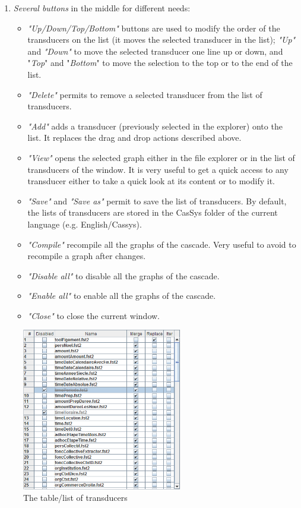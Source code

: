 \begin{enumerate}
	\item \textit{Several buttons} in the middle for different needs: 
		\begin{itemize}
			\item \textit{"Up/Down/Top/Bottom"} buttons are used to modify the order of the transducers on the list (it moves the selected transducer in the list); 
			\textit{"Up"} and \textit{"Down"} to move the selected transducer one line up or down, and "\textit{Top}" and "\textit{Bottom}" to move the selection to the top or to the end of the list.
			\item  \textit{"Delete"} permits to remove a selected transducer from the list of transducers. 
			\item		\textit{"Add"} adds a transducer (previously selected in the explorer) onto the list. It replaces the drag and drop actions described above. 
			\item \textit{"View"} opens the selected graph either in the file explorer or in the list of transducers of the window. It is very useful to get a quick access to any transducer either to take a quick look at its content or to modify it.
			\item \textit{"Save"} and \textit{"Save as"} permit to save the list of transducers. By default, the lists of transducers are stored in the CasSys folder of the current language (e.g. English/Cassys).
			\item \textit{"Compile"} recompile all the graphs of the cascade. Very useful to avoid to recompile a graph after changes.
			\item \textit{"Disable all"} to disable all the graphs of the cascade. 
			\item \textit{"Enable all"} to enable all the graphs of the cascade. 
			\item \textit{"Close"} to close the current window.
		\end{itemize}
\end{enumerate}

\begin{figure}[!htb]
  \centering
  \includegraphics[width=7cm]{resources/img/fig13-09.png}
  \caption{The table/list of transducers}
  \label{fig13-09}
\end{figure}

